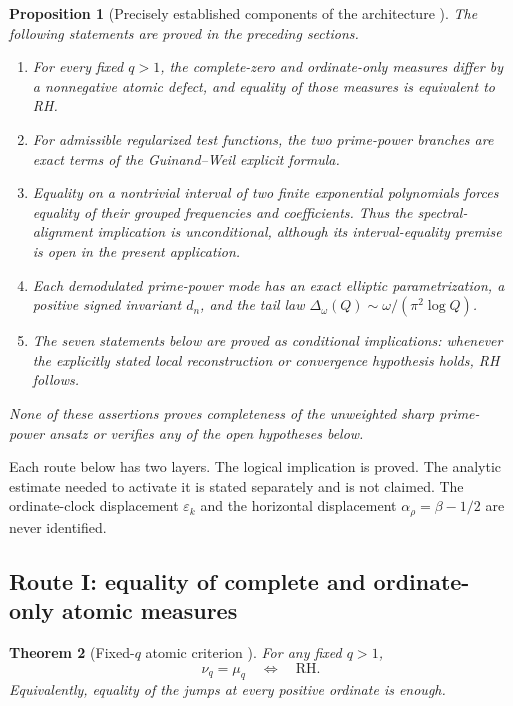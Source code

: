 \documentclass[11pt]{amsart}
\numberwithin{equation}{section}
\theoremstyle{plain}
\newtheorem{theorem}{Theorem}[section]
\newtheorem{proposition}[theorem]{Proposition}
\theoremstyle{definition}
\theoremstyle{remark}
\newcommand{\RH}{\mathrm{RH}}
\newcommand{\1}{\mathbf{1}}
\begin{document}
\begin{proposition}[Precisely established components of the architecture {}]
\label{prop:established_architecture_components}
The following statements are proved in the preceding sections.
\begin{enumerate}[label=\textup{(\roman*)}]
\item For every fixed \(q>1\), the complete-zero and ordinate-only measures
differ by a nonnegative atomic defect, and equality of those measures is
equivalent to RH.
\item For admissible regularized test functions, the two prime-power branches
are exact terms of the Guinand--Weil explicit formula.
\item Equality on a nontrivial interval of two finite exponential
polynomials forces equality of their grouped frequencies and coefficients.
Thus the spectral-alignment implication is unconditional, although its
interval-equality premise is open in the present application.
\item Each demodulated prime-power mode has an exact elliptic parametrization,
a positive signed invariant \(d_n\), and the tail law
\(\Delta_\omega(Q)\sim\omega/(\pi^2\log Q)\).
\item The seven statements below are proved as conditional implications:
whenever the explicitly stated local reconstruction or convergence hypothesis
holds, RH follows.
\end{enumerate}
None of these assertions proves completeness of the unweighted sharp
prime-power ansatz or verifies any of the open hypotheses below.
\end{proposition}

Each route below has two layers.  The logical implication is proved.  The
analytic estimate needed to activate it is stated separately and is not
claimed.  The ordinate-clock displacement $\varepsilon_k$ and the horizontal
displacement $\alpha_\rho=\beta-1/2$ are never identified.

\subsection{Route I: equality of complete and ordinate-only atomic measures}
\label{subsec:route_atomic_equality}


\begin{theorem}[Fixed-\(q\) atomic criterion {}]
\label{thm:route_fixed_q_atomic}
For any fixed $q>1$,
\begin{equation}
\nu_q=\mu_q
\quad\Longleftrightarrow\quad
\RH.
\label{eq:route_fixed_q_atomic}
\end{equation}
Equivalently, equality of the jumps at every positive ordinate is enough.
\end{theorem}
\end{document}
